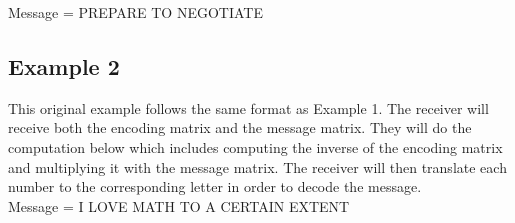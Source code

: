 \documentclass{article}
\begin{document}
{\center
Message = PREPARE TO NEGOTIATE
\endcenter}

\subsection{Example 2}
\noindent
This original example follows the same format as Example 1. The receiver will receive both the encoding matrix and the message matrix. They will do the computation below which includes computing the inverse of the encoding matrix and multiplying it with the message matrix. The receiver will then translate each number to the corresponding letter in order to decode the message. \\

\noindent
Message = I LOVE MATH TO A CERTAIN EXTENT \\
\end{document}
